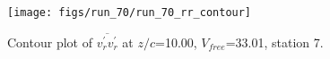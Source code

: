 \begin{figure}[H]
\centering
\texttt{[image: figs/run\_70/run\_70\_rr\_contour]}
\caption{Contour plot of $\overline{v_{r}^{\prime} v_{r}^{\prime}}$ at $z/c$=10.00, $V_{free}$=33.01, station 7.}
\label{fig:run_70_rr_contour}
\end{figure}


